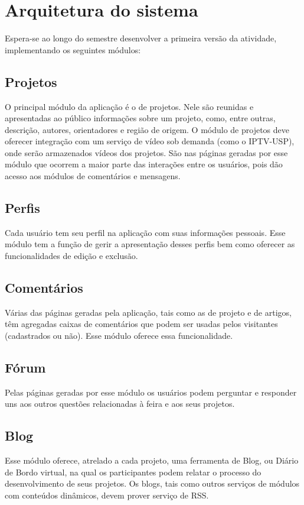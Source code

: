 \documentclass[a4paper,12pt,font=plain,header=plain]{abnt}
\begin{document}
  \section{Arquitetura do sistema}

    Espera-se ao longo do semestre desenvolver a primeira versão da atividade, implementando os seguintes módulos:

    \subsection{Projetos}
    O principal módulo da aplicação é o de projetos. Nele são reunidas e apresentadas ao público informações sobre um projeto, como, entre outras, descrição, autores, orientadores e região de origem. O módulo de projetos deve oferecer integração com um serviço de vídeo sob demanda (como o IPTV-USP), onde serão armazenados vídeos dos projetos. São nas páginas geradas por esse módulo que ocorrem a maior parte das interações entre os usuários, pois dão acesso aos módulos de comentários e mensagens.

    \subsection{Perfis}
    Cada usuário tem seu perfil na aplicação com suas informações pessoais. Esse módulo tem a função de gerir a apresentação desses perfis bem como oferecer as funcionalidades de edição e exclusão.

    \subsection{Comentários}
    Várias das páginas geradas pela aplicação, tais como as de projeto e de artigos, têm agregadas caixas de comentários que podem ser usadas pelos visitantes (cadastrados ou não). Esse módulo oferece essa funcionalidade.

    \subsection{Fórum}
    Pelas páginas geradas por esse módulo os usuários podem perguntar e responder uns aos outros questões relacionadas à feira e aos seus projetos.

    \subsection{Blog}
    Esse módulo oferece, atrelado a cada projeto, uma ferramenta de Blog, ou Diário de Bordo virtual, na qual os participantes podem relatar o processo do desenvolvimento de seus projetos. Os blogs, tais como outros serviços de
    módulos com conteúdos dinâmicos, devem prover serviço de RSS.
\end{document}
